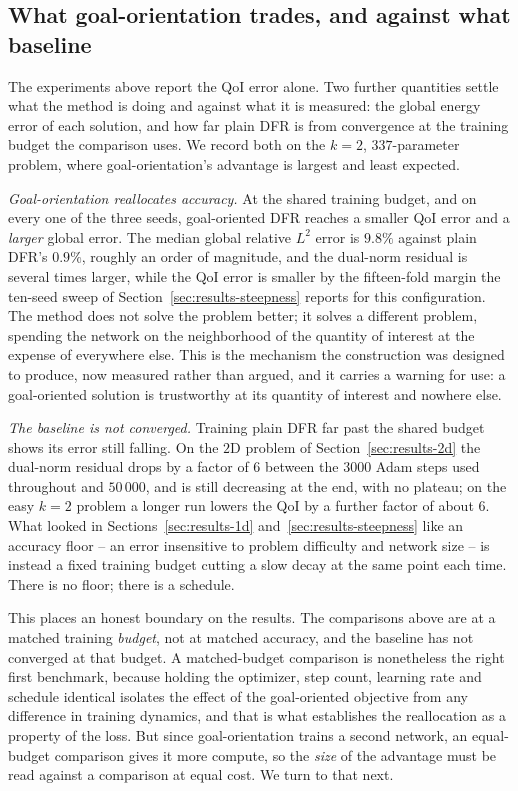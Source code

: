 \documentclass[preprint,11pt]{elsarticle}
\begin{document}
\subsection{What goal-orientation trades, and against what baseline}
\label{sec:results-tradeoff}

The experiments above report the QoI error alone. Two further quantities settle what the method is doing and against what it is measured: the global energy error of each solution, and how far plain DFR is from convergence at the training budget the comparison uses. We record both on the $k = 2$, $337$-parameter problem, where goal-orientation's advantage is largest and least expected.

\emph{Goal-orientation reallocates accuracy.} At the shared training budget, and on every one of the three seeds, goal-oriented DFR reaches a smaller QoI error and a \emph{larger} global error. The median global relative $L^2$ error is $9.8\%$ against plain DFR's $0.9\%$, roughly an order of magnitude, and the dual-norm residual is several times larger, while the QoI error is smaller by the fifteen-fold margin the ten-seed sweep of Section~\ref{sec:results-steepness} reports for this configuration. The method does not solve the problem better; it solves a different problem, spending the network on the neighborhood of the quantity of interest at the expense of everywhere else. This is the mechanism the construction was designed to produce, now measured rather than argued, and it carries a warning for use: a goal-oriented solution is trustworthy at its quantity of interest and nowhere else.

\emph{The baseline is not converged.} Training plain DFR far past the shared budget shows its error still falling. On the $2$D problem of Section~\ref{sec:results-2d} the dual-norm residual drops by a factor of $6$ between the $3000$ Adam steps used throughout and $50\,000$, and is still decreasing at the end, with no plateau; on the easy $k = 2$ problem a longer run lowers the QoI by a further factor of about $6$. What looked in Sections~\ref{sec:results-1d} and~\ref{sec:results-steepness} like an accuracy floor -- an error insensitive to problem difficulty and network size -- is instead a fixed training budget cutting a slow decay at the same point each time. There is no floor; there is a schedule.

This places an honest boundary on the results. The comparisons above are at a matched training \emph{budget}, not at matched accuracy, and the baseline has not converged at that budget. A matched-budget comparison is nonetheless the right first benchmark, because holding the optimizer, step count, learning rate and schedule identical isolates the effect of the goal-oriented objective from any difference in training dynamics, and that is what establishes the reallocation as a property of the loss. But since goal-orientation trains a second network, an equal-budget comparison gives it more compute, so the \emph{size} of the advantage must be read against a comparison at equal cost. We turn to that next.
\end{document}

